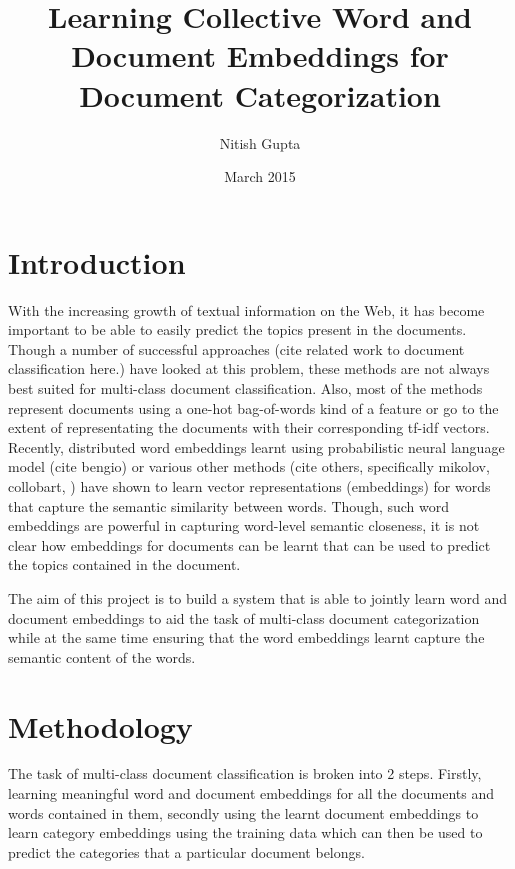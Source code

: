 \documentclass{article}
\title{Learning Collective Word and Document Embeddings for Document Categorization}
\author{Nitish Gupta}
\date{March 2015}
\begin{document}
\maketitle

\section{Introduction}
With the increasing growth of textual information on the Web, it has become important to be able to easily predict the topics present in the documents. Though a number of successful approaches (cite related work to document classification here.) have looked at this problem, these methods are not always best suited for multi-class document classification. Also, most of the methods represent documents using a one-hot bag-of-words kind of a feature or go to the extent of representating the documents with their corresponding tf-idf vectors. Recently, distributed word embeddings learnt using probabilistic neural language model (cite bengio) or various other methods (cite others, specifically mikolov, collobart, ) have shown to learn vector representations (embeddings) for words that capture the semantic similarity between words. Though, such word embeddings are powerful in capturing word-level semantic closeness, it is not clear how embeddings for documents can be learnt that can be used to predict the topics contained in the document.

The aim of this project is to build a system that is able to jointly learn word and document embeddings to aid the task of multi-class document categorization while at the same time ensuring that the word embeddings learnt capture the semantic content of the words.

\section{Methodology}
The task of multi-class document classification is broken into 2 steps. Firstly, learning meaningful word and document embeddings for all the documents and words contained in them, secondly using the learnt document embeddings to learn category embeddings using the training data which can then be used to predict the categories that a particular document belongs.
\end{document}
